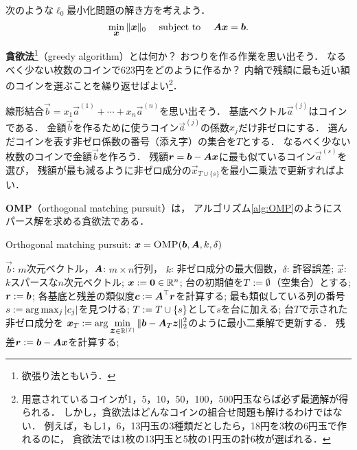 



次のような$\ell_0$最小化問題の解き方を考えよう．
\begin{equation}
 \min_{\small\mbox{\boldmath $x$}} \|\mbox{\boldmath $x$}\|_0\quad\mbox{ subject to }\quad \mbox{\boldmath $A$}\mbox{\boldmath $x$}=\mbox{\boldmath $b$}.
\label{eq:l0 min}
\end{equation}

{\bf 貪欲法}\footnote{欲張り法ともいう．}（greedy algorithm）とは何か？
おつりを作る作業を思い出そう．
なるべく少ない枚数のコインで623円をどのように作るか？
内輪で残額に最も近い額のコインを選ぶことを繰り返せばよい\footnote{%
用意されているコインが1，5，10，50，100，500円玉ならば必ず最適解が得られる．
しかし，貪欲法はどんなコインの組合せ問題も解けるわけではない．
例えば，もし1，6，13円玉の3種類だとしたら，18円を3枚の6円玉で作れるのに，
貪欲法では1枚の13円玉と5枚の1円玉の計6枚が選ばれる．}．

線形結合$\vec b=x_1\vec a^{(1)}+\cdots+x_n\vec a^{(n)}$を思い出そう．
基底ベクトル$\vec a^{(j)}$はコインである．
金額$\vec b$を作るために使うコイン$\vec a^{(j)}$の係数$x_j$だけ非ゼロにする．
選んだコインを表す非ゼロ係数の番号（添え字）の集合を$T$とする．
なるべく少ない枚数のコインで金額$\vec b$を作ろう．
残額$\mbox{\boldmath $r$}=\mbox{\boldmath $b$}-\mbox{\boldmath $A$}\mbox{\boldmath $x$}$に最も似ているコイン$\vec a^{(s)}$を選び，
残額が最も減るように非ゼロ成分の$\vec x_{T\cup \{s\}}$を最小二乗法で更新すればよい．



{\bf OMP}（orthogonal matching pursuit）\cite{Pati93,Tropp04,Tropp07}は，
アルゴリズム\ref{alg:OMP}のようにスパース解を求める貪欲法である．

\begin{algorithm}[h]
\caption{Orthogonal matching pursuit: $\mbox{\boldmath $x$} = \mbox{\sc OMP}(\mbox{\boldmath $b$},\mbox{\boldmath $A$},k,\delta)$}
\label{alg:OMP}
\begin{algorithmic}[1]
\REQUIRE
$\vec b$: $m$次元ベクトル，$\mbox{\boldmath $A$}$: $m\times n$行列，
$k$: 非ゼロ成分の最大個数，$\delta$: 許容誤差;
\ENSURE $\vec x$: $k$スパースな$n$次元ベクトル;
\STATE
$\mbox{\boldmath $x$} := \mbox{\boldmath $0$}\in\mathbb{R}^{n}$;
\STATE
台の初期値を$T:=\emptyset$（空集合）とする;
\STATE
$\mbox{\boldmath $r$}:=\mbox{\boldmath $b$}$;
\STATE
各基底と残差の類似度$\mbox{\boldmath $c$}:=\mbox{\boldmath $A$}^\top\mbox{\boldmath $r$}$を計算する;
\label{step:similarity}
\STATE
最も類似している列の番号$s:=\arg\max_{j} |c_j|$を見つける;
\label{step:find max}
\STATE
$T:= T\cup\{s\}$として$s$を台に加える;
\label{step:union T}
\STATE
台$T$で示された非ゼロ成分を
$\displaystyle\mbox{\boldmath $x$}_T:=\arg\min_{\mbox{\boldmath $z$}\in\mathbb{R}^{|T|}}\|\mbox{\boldmath $b$}-\mbox{\boldmath $A$}_T\mbox{\boldmath $z$}\|_2^2$のように最小二乗解で更新する．
\label{step:lsq T}
\STATE
残差$\mbox{\boldmath $r$}:=\mbox{\boldmath $b$}-\mbox{\boldmath $A$}\mbox{\boldmath $x$}$を計算する;
\ENDWHILE
\end{algorithmic}
\end{algorithm}

